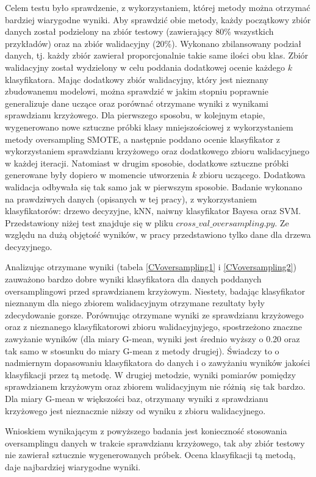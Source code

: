 Celem testu było sprawdzenie, z wykorzystaniem, której metody można otrzymać bardziej wiarygodne wyniki. Aby sprawdzić obie metody, każdy początkowy zbiór danych został podzielony na zbiór testowy (zawierający 80\% wszystkich przykładów) oraz na zbiór walidacyjny (20\%). Wykonano zbilansowany podział danych, tj. każdy zbiór zawierał proporcjonalnie takie same ilości obu klas. Zbiór walidacyjny został wydzielony w celu poddania dodatkowej ocenie każdego $k$ klasyfikatora. Mając dodatkowy zbiór walidacyjny, który jest nieznany zbudowanemu modelowi, można sprawdzić w jakim stopniu poprawnie generalizuje dane uczące oraz porównać otrzymane wyniki z wynikami sprawdzianu krzyżowego. Dla pierwszego sposobu, w kolejnym etapie, wygenerowano nowe sztuczne próbki klasy mniejszościowej z wykorzystaniem metody oversampling SMOTE, a następnie poddano ocenie klasyfikator z wykorzystaniem sprawdzianu krzyżowego oraz dodatkowego zbioru walidacyjnego w każdej iteracji. Natomiast w drugim sposobie, dodatkowe sztuczne próbki generowane były dopiero w momencie utworzenia $k$ zbioru uczącego. Dodatkowa walidacja odbywała się tak samo jak w pierwszym sposobie. Badanie wykonano na prawdziwych danych (opisanych w tej pracy), z wykorzystaniem klasyfikatorów: drzewo decyzyjne, kNN, naiwny klasyfikator Bayesa oraz SVM. Przedstawiony niżej test znajduje się w pliku $cross\_val\_oversampling.py$. Ze względu na dużą objętość wyników, w pracy przedstawiono tylko dane dla drzewa decyzyjnego. \par
Analizując otrzymane wyniki (tabela \ref{CVoversampling1} i \ref{CVoversampling2}) zauważono bardzo dobre wyniki klasyfikatora dla danych poddanych oversamplingowi przed sprawdzianem krzyżowym. Niestety, badając klasyfikator nieznanym dla niego zbiorem walidacyjnym otrzymane rezultaty były zdecydowanie gorsze. Porównując otrzymane wyniki ze sprawdzianu krzyżowego oraz z nieznanego klasyfikatorowi zbioru walidacyjnyjego, spostrzeżono znaczne zawyżanie wyników (dla miary G-mean, wyniki jest średnio wyższy o 0.20 oraz tak samo w stosunku do miary G-mean z metody drugiej). Świadczy to o nadmiernym dopasowaniu klasyfikatora do danych i o zawyżaniu wyników jakości klasyfikacji przez tą metodę. W drugiej metodzie, wyniki pomiarów pomiędzy sprawdzianem krzyżowym oraz zbiorem walidacyjnym nie różnią się tak bardzo. Dla miary G-mean w większości baz, otrzymany wyniki z sprawdzianu krzyżowego jest nieznacznie niższy od wyniku z zbioru walidacyjnego. \par
Wnioskiem wynikającym z powyższego badania jest konieczność stosowania oversamplingu danych w trakcie sprawdzianu krzyżowego, tak aby zbiór testowy nie zawierał sztucznie wygenerowanych próbek. Ocena klasyfikacji tą metodą, daje najbardziej wiarygodne wyniki.
